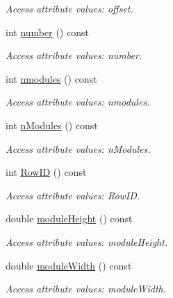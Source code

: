 \begin{DoxyCompactItemize}
\begin{DoxyCompactList}\small\item\em Access attribute values: offset. \item\end{DoxyCompactList}\item 
int \hyperlink{struct_d_d4hep_1_1_x_m_l_1_1_dimension_a23f3ab6cc70dd70e7b6ac73f0be7d086}{number} () const 
\begin{DoxyCompactList}\small\item\em Access attribute values: number. \item\end{DoxyCompactList}\item 
int \hyperlink{struct_d_d4hep_1_1_x_m_l_1_1_dimension_af226bfb45cf52f5ce88e8af8eb1bfa0b}{nmodules} () const 
\begin{DoxyCompactList}\small\item\em Access attribute values: nmodules. \item\end{DoxyCompactList}\item 
int \hyperlink{struct_d_d4hep_1_1_x_m_l_1_1_dimension_a3f7ed58b279d16bfc445accca908def3}{nModules} () const 
\begin{DoxyCompactList}\small\item\em Access attribute values: nModules. \item\end{DoxyCompactList}\item 
int \hyperlink{struct_d_d4hep_1_1_x_m_l_1_1_dimension_a94f92d7cc65da148b3cf7e1b0bef949e}{RowID} () const 
\begin{DoxyCompactList}\small\item\em Access attribute values: RowID. \item\end{DoxyCompactList}\item 
double \hyperlink{struct_d_d4hep_1_1_x_m_l_1_1_dimension_a10482e9c5e93105ea30722b4a3fddea4}{moduleHeight} () const 
\begin{DoxyCompactList}\small\item\em Access attribute values: moduleHeight. \item\end{DoxyCompactList}\item 
double \hyperlink{struct_d_d4hep_1_1_x_m_l_1_1_dimension_a8b9e5161f6a21a9c936463281e4ffdac}{moduleWidth} () const 
\begin{DoxyCompactList}\small\item\em Access attribute values: moduleWidth. \item\end{DoxyCompactList}\item 

\end{DoxyCompactItemize}
